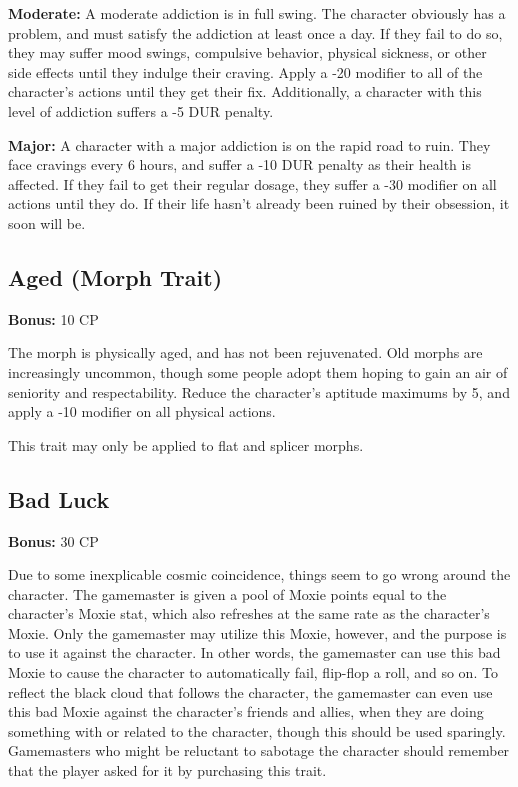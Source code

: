 \textbf{Moderate:} A moderate addiction is in full swing. The character obviously has a problem, and must satisfy the addiction at least once a day. If they fail to do so, they may suffer mood swings, compulsive behavior, physical sickness, or other side effects until they indulge their craving. Apply a -20 modifier to all of the character’s actions until they get their fix. Additionally, a character with this level of addiction suffers a -5 DUR penalty. 

\textbf{Major:} A character with a major addiction is on the rapid road to ruin. They face cravings every 6 hours, and suffer a -10 DUR penalty as their health is affected. If they fail to get their regular dosage, they suffer a -30 modifier on all actions until they do. If their life hasn’t already been ruined by their obsession, it soon will be. 

\subsection{Aged (Morph Trait)} \textbf{Bonus:} 10 CP 

The morph is physically aged, and has not been rejuvenated. Old morphs are increasingly uncommon, though some people adopt them hoping to gain an air of seniority and respectability. Reduce the character’s aptitude maximums by 5, and apply a -10 modifier on all physical actions. 

This trait may only be applied to flat and splicer morphs. 

\subsection{Bad Luck} \label{sec:traits-bad-luck} 

\textbf{Bonus:} 30 CP 

Due to some inexplicable cosmic coincidence, things seem to go wrong around the character. The gamemaster is given a pool of Moxie points equal to the character’s Moxie stat, which also refreshes at the same rate as the character’s Moxie. Only the gamemaster may utilize this Moxie, however, and the purpose is to use it against the character. In other words, the gamemaster can use this bad Moxie to cause the character to automatically fail, flip-flop a roll, and so on. To reflect the black cloud that follows the character, the gamemaster can even use this bad Moxie against the character’s friends and allies, when they are doing something with or related to the character, though this should be used sparingly. Gamemasters who might be reluctant to sabotage the character should remember that the player asked for it by purchasing this trait. 





